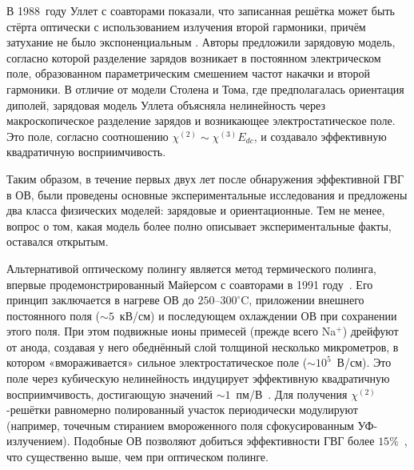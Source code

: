 В 1988~году Уллет с соавторами показали, что записанная решётка может быть стёрта оптически с использованием излучения второй гармоники, причём затухание не было экспоненциальным \cite{ouellette1988light}. Авторы предложили зарядовую модель, согласно которой  разделение зарядов возникает в постоянном электрическом поле, образованном параметрическим смешением частот накачки и второй гармоники. В отличие от модели Столена и Тома, где предполагалась ориентация диполей, зарядовая модель Уллета объясняла нелинейность через макроскопическое разделение зарядов и возникающее электростатическое поле. Это поле, согласно соотношению $\chi^{(2)} \sim \chi^{(3)} E_{dc}$, и создавало эффективную квадратичную восприимчивость.

Таким образом, в течение первых двух лет после обнаружения эффективной ГВГ в ОВ, были проведены основные экспериментальные исследования и предложены два класса физических моделей: зарядовые и ориентационные. Тем не менее, вопрос о том, какая модель более полно описывает экспериментальные факты, оставался открытым.

Альтернативой оптическому полингу является метод термического полинга, впервые продемонстрированный Майерсом с соавторами в 1991 году~\cite{myers1991large}.  Его принцип заключается в нагреве ОВ до $250$--$300^{\circ}$C, приложении внешнего постоянного поля ($\sim 5$~кВ/см) и последующем охлаждении ОВ при сохранении этого поля. При этом подвижные ионы примесей (прежде всего Na$^+$) дрейфуют от анода, создавая у него обеднённый слой толщиной несколько микрометров, в котором «вмораживается» сильное электростатическое поле ($\sim 10^5$~В/см). Это поле через кубическую нелинейность индуцирует эффективную квадратичную восприимчивость, достигающую значений $\sim 1$~пм/В~\cite{de2020thermal}. Для получения $\chi^{(2)}$-решётки равномерно полированный участок периодически модулируют (например, точечным стиранием вмороженного поля сфокусированным УФ-излучением). Подобные ОВ позволяют добиться эффективности ГВГ более $15\%$~\cite{canagasabey2009high}, что существенно выше, чем при оптическом полинге.

